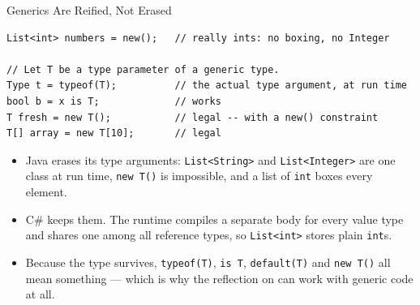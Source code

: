 \begin{frame}[fragile]{Generics Are Reified, Not Erased}
  \begin{lstlisting}[basicstyle=\scriptsize\ttfamily]
List<int> numbers = new();   // really ints: no boxing, no Integer

// Let T be a type parameter of a generic type.
Type t = typeof(T);          // the actual type argument, at run time
bool b = x is T;             // works
T fresh = new T();           // legal -- with a new() constraint
T[] array = new T[10];       // legal
  \end{lstlisting}
  \vspace{1ex}

  \begin{itemize}
    \item Java erases its type arguments: \texttt{List<String>} and
      \texttt{List<Integer>} are one class at run time, \texttt{new T()} is
      impossible, and a list of \texttt{int} boxes every element.
    \item C\# keeps them. The runtime compiles a separate body for every value
      type and shares one among all reference types, so \texttt{List<int>}
      stores plain \texttt{int}s.
    \item Because the type survives, \texttt{typeof(T)}, \texttt{is~T},
      \texttt{default(T)} and \texttt{new T()} all mean something --- which is
      why the reflection on  can work with generic
      code at all.
  \end{itemize}
\end{frame}

